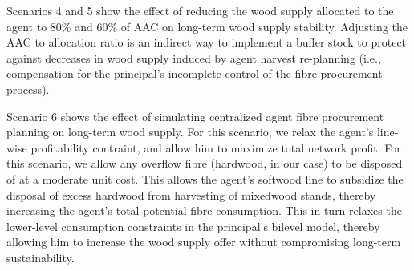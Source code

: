 Scenarios 4 and 5 show the effect of reducing the wood supply allocated to the agent to 80\% and 60\% of AAC on long-term wood supply stability. Adjusting the AAC to allocation ratio is an indirect way to implement a buffer stock to protect against decreases in wood supply induced by agent harvest re-planning (i.e., compensation for the principal's incomplete control of the fibre procurement process).

Scenario 6 shows the effect of simulating centralized agent fibre procurement planning on long-term wood supply. For this scenario, we relax the agent's line-wise profitability contraint, and allow him to maximize total network profit. For this scenario, we allow any overflow fibre (hardwood, in our case) to be disposed of at a moderate unit cost. This allows the agent's softwood line to subsidize the disposal of excess hardwood from harvesting of mixedwood stands, thereby increasing the agent's total potential fibre consumption. This in turn relaxes the lower-level consumption constraints in the principal's bilevel model, thereby allowing him to increase the wood supply offer without compromising long-term sustainability. 







